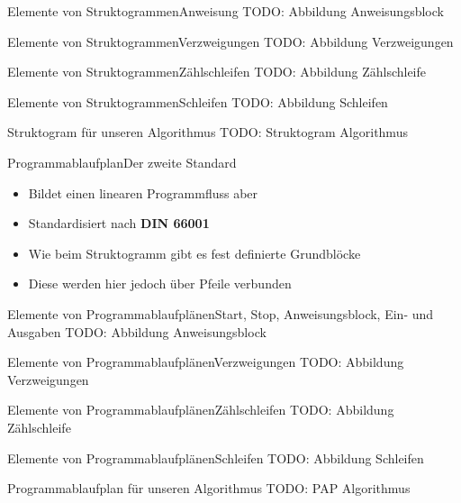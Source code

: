 \begin{frame}{Elemente von Struktogrammen}{Anweisung}
TODO: Abbildung Anweisungsblock
\end{frame}

\begin{frame}{Elemente von Struktogrammen}{Verzweigungen}
TODO: Abbildung Verzweigungen
\end{frame}

\begin{frame}{Elemente von Struktogrammen}{Zählschleifen}
TODO: Abbildung Zählschleife
\end{frame}

\begin{frame}{Elemente von Struktogrammen}{Schleifen}
TODO: Abbildung Schleifen
\end{frame}

\begin{frame}{Struktogram für unseren Algorithmus}
TODO: Struktogram Algorithmus
\end{frame}

\begin{frame}{Programmablaufplan}{Der zweite Standard}
    \begin{itemize}
        \item Bildet einen linearen Programmfluss aber
        \item Standardisiert nach \textbf{DIN 66001}
        \item Wie beim Struktogramm gibt es fest definierte Grundblöcke
        \item Diese werden hier jedoch über Pfeile verbunden
    \end{itemize}
\end{frame}

\begin{frame}{Elemente von Programmablaufplänen}{Start, Stop, Anweisungsblock, Ein- und Ausgaben}
TODO: Abbildung Anweisungsblock
\end{frame}

\begin{frame}{Elemente von Programmablaufplänen}{Verzweigungen}
TODO: Abbildung Verzweigungen
\end{frame}

\begin{frame}{Elemente von Programmablaufplänen}{Zählschleifen}
TODO: Abbildung Zählschleife
\end{frame}

\begin{frame}{Elemente von Programmablaufplänen}{Schleifen}
TODO: Abbildung Schleifen
\end{frame}

\begin{frame}{Programmablaufplan für unseren Algorithmus}
TODO: PAP Algorithmus
\end{frame}